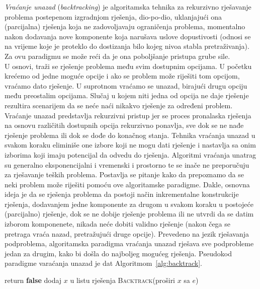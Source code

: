   \textit{Vraćanje unazad} (\textit{backtracking}) je algoritamska tehnika za rekurzivno rješavanje problema postepenom izgradnjom  rješenja, dio-po-dio, uklanjajući ona (parcija\-lna) rješenja koja ne zadovoljavaju ograničenja problema, momentalno nakon dodavanja nove komponente koja narušava uslove dopustivosti (odnosi se na vrijeme koje je proteklo do dostizanja bilo kojeg nivoa stabla pretraživanja). Za ovu paradigmu se može reći da je ona  poboljšanje pristupa grube sile.\\
  
  U osnovi,   traži  se  rješenje problema među svim dostupnim opcijama. U početku krećemo od jedne moguće opcije i ako se problem može riješiti tom opcijom, vraćamo dato rješenje. U suprotnom vraćamo se unazad, birajući drugu opciju među preostalim   opcijama. Slučaj u kojem  niti jedna od opcija ne daje rješenje rezultira scenarijem da se neće naći nikakvo rješenje za  određeni problem.  Vraćanje unazad predstavlja rekurzivni pristup jer se proces pronalaska rješenja na osnovu različitih dostupnih opcija rekurzivno ponavlja, sve dok se ne nađe rješenje problema ili dok se dođe do konačnog stanja.  Tehnika vraćanja unazad u svakom koraku eliminiše one izbore koji ne mogu dati rješenje i nastavlja   sa onim izborima koji imaju potencijal da odvedu do rješenja. Algoritmi vraćanja unatrag su generalno eksponencijalni i  vremenski i prostorno te se inače ne preporučuju za rješavanje teških proble\-ma.   Postavlja se pitanje kako da prepoznamo da se neki problem može riješiti pomoću ove algoritamske paradigme. Dakle, osnovna ideja je da se rješenja problema da postoji način inkrementalne konstrukcije rješenja, dodavanjem jedne komponente za drugom u svakom koraku u postojeće (parcijalno) rješenje, dok se ne dobije rješenje problema ili ne utvrdi da se datim izborom komponenete, nikada neće dobiti validno rješenje (nakon čega se pretraga vraća nazad, pretražujući druge opcije). Prevedeno na jezik rješavanja podproblema, algoritamska paradigma vraćanja unazad rješava sve podprobleme jedan za drugim, kako bi  došla do najboljeg mogućeg rješenja. Pseudokod paradigme varaćanja unazad je dat Algoritmom~\ref{alg:backtrack}. 
    
    \begin{algorithm}
    	\begin{algorithmic}[1]
    		        \State return \textbf{false}
    		   \EndIf
    		     \State dodaj $x$ u listu rješenja
    		  \EndIf
    		      \State \textsc{Backtrack}(proširi $x$ sa $e$)
    		  \EndFor
    		\EndProcedure
    	\end{algorithmic}

        \caption{Paradigma vraćanja unazad. }        \label{alg:backtrack}
    \end{algorithm}
    
